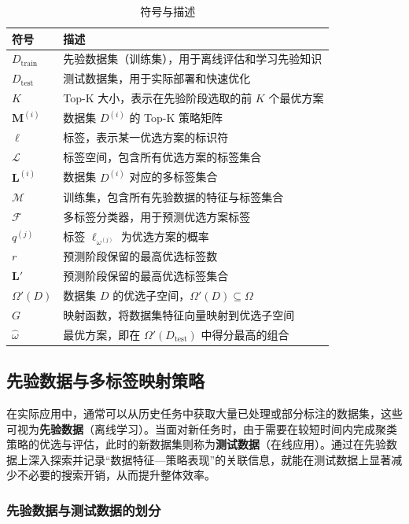 \documentclass[10pt]{article} %
\numberwithin{equation}{section}
\begin{document}
\begin{table}[ht]
\centering
\caption{符号与描述}
\label{tab:symbols-advanced}
\begin{tabular}{ll}
\toprule
\textbf{符号} & \textbf{描述} \\
\midrule
$D_{\text{train}}$ & 先验数据集（训练集），用于离线评估和学习先验知识 \\
$D_{\text{test}}$ & 测试数据集，用于实际部署和快速优化 \\
$K$ & Top-K 大小，表示在先验阶段选取的前 $K$ 个最优方案 \\
$\mathbf{M}^{(i)}$ & 数据集 $D^{(i)}$ 的 Top-K 策略矩阵 \\
$\ell$ & 标签，表示某一优选方案的标识符 \\
$\mathcal{L}$ & 标签空间，包含所有优选方案的标签集合 \\
$\mathbf{L}^{(i)}$ & 数据集 $D^{(i)}$ 对应的多标签集合 \\
$\mathcal{M}$ & 训练集，包含所有先验数据的特征与标签集合 \\
$\mathcal{F}$ & 多标签分类器，用于预测优选方案标签 \\
$q^{(j)}$ & 标签 $\ell_{\omega^{(j)}}$ 为优选方案的概率 \\
$r$ & 预测阶段保留的最高优选标签数 \\
$\mathbf{L}'$ & 预测阶段保留的最高优选标签集合 \\
$\Omega'(D)$ & 数据集 $D$ 的优选子空间，$\Omega'(D) \subseteq \Omega$ \\
$G$ & 映射函数，将数据集特征向量映射到优选子空间 \\
$\hat{\omega}$ & 最优方案，即在 $\Omega'(D_{\text{test}})$ 中得分最高的组合 \\
\bottomrule
\end{tabular}
\end{table}
\subsection{先验数据与多标签映射策略}
\label{sec:prior-data-mapping}

在实际应用中，通常可以从历史任务中获取大量已处理或部分标注的数据集，这些可视为\textbf{先验数据}（离线学习）。当面对新任务时，由于需要在较短时间内完成聚类策略的优选与评估，此时的新数据集则称为\textbf{测试数据}（在线应用）。通过在先验数据上深入探索并记录“数据特征—策略表现”的关联信息，就能在测试数据上显著减少不必要的搜索开销，从而提升整体效率。

\subsubsection{先验数据与测试数据的划分}
\label{subsec:dataset-split}
\end{document}
